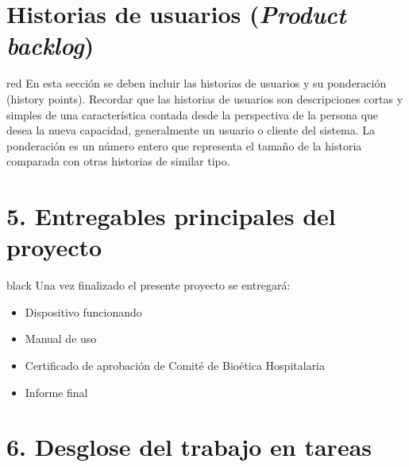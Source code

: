\documentclass[11pt]{charter}
\begin{document}
\pagebreak

\section{Historias de usuarios (\textit{Product backlog})}
\label{sec:backlog}

\begin{consigna}{red}
En esta sección se deben incluir las historias de usuarios y su ponderación (history points). Recordar que las historias de usuarios son descripciones cortas y simples de una característica contada desde la perspectiva de la persona que desea la nueva capacidad, generalmente un usuario o cliente del sistema. La ponderación es un número entero que representa el tamaño de la historia comparada con otras historias de similar tipo.
\end{consigna}

\pagebreak

\section{5. Entregables principales del proyecto}
\label{sec:entregables}
\begin{consigna}{black}
Una vez finalizado el presente proyecto se entregará:
\begin{itemize}
\item Dispositivo funcionando
\item Manual de uso
\item Certificado de aprobación de Comité de Bioética Hospitalaria
\item Informe final

\end{itemize}

\end{consigna}

\pagebreak

\section{6. Desglose del trabajo en tareas}
\label{sec:wbs}
\end{document}
